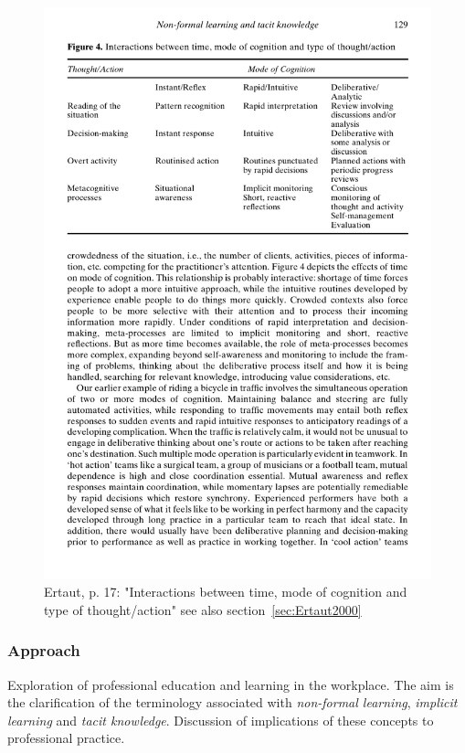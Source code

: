 \documentclass[12pt,a4paper]{article}
\begin{document}
    \begin{figure}[htb]
      \centering
      \includegraphics[width=12cm]{Meeting 4 NON-FORMAL LEARNING - Seite 17.pdf}
      \caption{Ertaut, p. 17: "Interactions between time, mode of cognition and type of thought/action" see also section~\ref{sec:Ertaut2000}}
      \label{fig:Ertaut cognitioninteractions}
    \end{figure}



    \subsubsection{Approach}
      Exploration of professional education and learning in the workplace. The aim is the clarification of the terminology associated with \emph{non-formal learning}, \emph{implicit learning} and \emph{tacit knowledge}. Discussion of implications of these concepts to professional practice.
\end{document}

